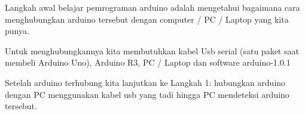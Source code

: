  Langkah awal belajar pemrograman arduino adalah mengetahui bagaimana cara menghubungkan arduino tersebut dengan computer / PC / Laptop yang kita punya.

Untuk menghubungkannya kita membutuhkan kabel Usb serial (satu paket saat membeli Arduino Uno), Arduino R3, PC / Laptop dan software arduino-1.0.1

Setelah arduino terhubung kita lanjutkan ke Langkah 1:
hubungkan arduino dengan PC menggunakan kabel usb yang tadi hingga PC mendeteksi arduino tersebut. 